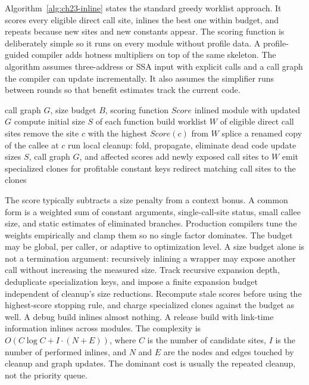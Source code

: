 Algorithm~\ref{alg:ch23-inline} states the standard greedy worklist approach.
It scores every eligible direct call site, inlines the best one within budget, and repeats because new sites and new constants appear.
The scoring function is deliberately simple so it runs on every module without profile data.
A profile-guided compiler adds hotness multipliers on top of the same skeleton.
The algorithm assumes three-address or SSA input with explicit calls and a call graph the compiler can update incrementally.
It also assumes the simplifier runs between rounds so that benefit estimates track the current code.

\begin{algorithm}[htbp]
\caption{Greedy cost-guided inlining with a size budget}\label{alg:ch23-inline}
\begin{pseudocode}
\Require call graph $G$, size budget $B$, scoring function $Score$
\Ensure inlined module with updated $G$
\State compute initial size $S$ of each function
\State build worklist $W$ of eligible direct call sites
\State remove the site $c$ with the highest $Score(c)$ from $W$
\State \Break
\EndIf
{}
\State \Continue
\EndIf
\State splice a renamed copy of the callee at $c$
\State run local cleanup: fold, propagate, eliminate dead code
\State update sizes $S$, call graph $G$, and affected scores
\State add newly exposed call sites to $W$
\EndWhile
\State emit specialized clones for profitable constant keys
\State redirect matching call sites to the clones
\end{pseudocode}
\end{algorithm}

The score typically subtracts a size penalty from a context bonus.
A common form is a weighted sum of constant arguments, single-call-site status, small callee size, and static estimates of eliminated branches.
Production compilers tune the weights empirically and clamp them so no single factor dominates.
The budget may be global, per caller, or adaptive to optimization level.
A size budget alone is not a termination argument: recursively inlining a wrapper may expose another call without increasing the measured size.
Track recursive expansion depth, deduplicate specialization keys, and impose a finite expansion budget independent of cleanup's size reductions.
Recompute stale scores before using the highest-score stopping rule, and charge specialized clones against the budget as well.
A debug build inlines almost nothing.
A release build with link-time information inlines across modules.
The complexity is $O(C \log C + I \cdot (N + E))$, where $C$ is the number of candidate sites, $I$ is the number of performed inlines, and $N$ and $E$ are the nodes and edges touched by cleanup and graph updates.
The dominant cost is usually the repeated cleanup, not the priority queue.

